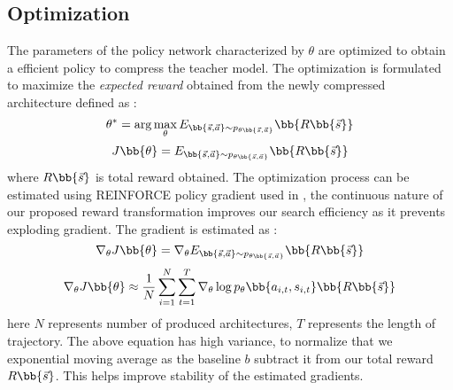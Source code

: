 \documentclass[../main]{subfiles}
\begin{document}
    \subsection{Optimization}
        The parameters of the policy network characterized by $\theta$ are optimized to obtain a efficient policy to compress the teacher model.
        The optimization is formulated to maximize the \textit{expected reward} obtained from the newly compressed architecture defined as :
        \begin{equation}
            \theta^{*} = \arg \max_{\theta} E_{\bb{\Vec{s}, \Vec{a}} \sim p_{\theta\bb{\Vec{s}, \Vec{a}}}} \bb{R\bb{\Vec{s}}}
        \end{equation}
        \begin{equation} 
            J \bb{\theta} = E_{\bb{\Vec{s}, \Vec{a}} \sim p_{\theta\bb{\Vec{s}, \Vec{a}}}} \bb{R\bb{\Vec{s}}}
        \end{equation}
        where $R\bb{\Vec{s}}$ is total reward obtained.
        The optimization process can be estimated using REINFORCE policy gradient used in \cite{williams1992simple}, the continuous nature of our proposed reward transformation improves our search efficiency as it prevents exploding gradient.
        The gradient is estimated as :
        \begin{equation}
            \nabla_{\theta}  J \bb{\theta} = \nabla_{\theta} E_{\bb{\Vec{s}, \Vec{a}} \sim p_{\theta\bb{\Vec{s}, \Vec{a}}}} \bb{R\bb{\Vec{s}}}
        \end{equation}
        \begin{equation}
             \nabla_{\theta}  J \bb{\theta} \approx \frac{1}{N} \sum_{i = 1}^{N} \sum_{t = 1}^{T} \nabla_{\theta} \log{p_{\theta}\bb{a_{i,t}, s_{i,t}}} \bb{R\bb{\Vec{s}}}
        \end{equation}
        here $N$ represents number of produced architectures, $T$ represents the length of trajectory.
        The above equation has high variance, to normalize that we exponential moving average as the baseline $b$ subtract it from our total reward $R\bb{\Vec{s}}$.
        This helps improve stability of the estimated gradients.
\end{document}
